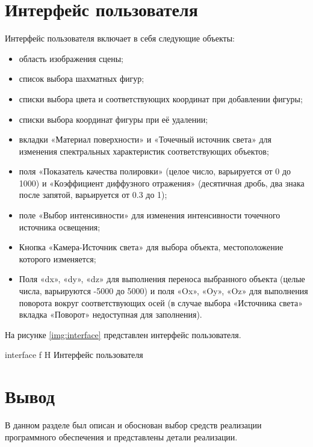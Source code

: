 \section{Интерфейс пользователя}

Интерфейс пользователя включает в себя следующие объекты:

\begin{itemize}
	\item область изображения сцены;
	\item список выбора шахматных фигур;
	\item списки выбора цвета и соответствующих координат при добавлении фигуры;
	\item списки выбора координат фигуры при её удалении;
	\item вкладки «Материал поверхности» и «Точечный источник света» для изменения спектральных характеристик соответствующих объектов;
	\item поля «Показатель качества полировки» (целое число, варьируется от 0 до 1000) и «Коэффициент диффузного отражения» (десятичная дробь, два знака после запятой, варьируется от 0.3 до 1);
	\item поле «Выбор интенсивности» для изменения интенсивности точечного источника освещения;
	\item Кнопка «Камера-Источник света» для выбора объекта, местоположение которого изменяется;
	\item Поля «dx», «dy», «dz» для выполнения переноса выбранного объекта (целые числа, варьируются -5000 до 5000) и поля «Ox», «Oy», «Oz» для выполнения поворота вокруг соответствующих осей (в случае выбора «Источника света» вкладка «Поворот» недоступная для заполнения).
\end{itemize}

На рисунке \ref{img:interface} представлен интерфейс пользователя. 

{interface}
{f}
{H}
{\textwidth}
{Интерфейс пользователя}

\section*{Вывод}

В данном разделе был описан и обоснован выбор средств реализации программного обеспечения и представлены детали реализации.

